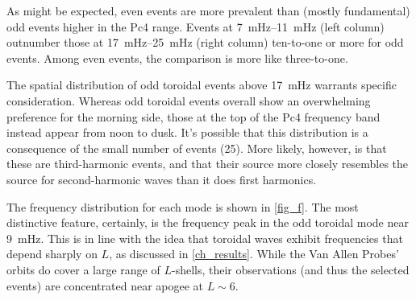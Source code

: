 
As might be expected, even events are more prevalent than (mostly fundamental)
odd events higher in the Pc4 range. Events at \SIrange{7}{11}{\mHz} (left
column) outnumber those at \SIrange{17}{25}{\mHz} (right column) ten-to-one or
more for odd events. Among even events, the comparison is more like
three-to-one. 

The spatial distribution of odd toroidal events above \SI{17}{\mHz} warrants
specific consideration. Whereas odd toroidal events overall show an
overwhelming preference for the morning side, those at the top of the Pc4
frequency band instead appear from noon to dusk. It's possible that this
distribution is a consequence of the small number of events (25). More likely,
however, is that these are third-harmonic events, and that their source more
closely resembles the source for second-harmonic waves than it does first
harmonics. 


The frequency distribution for each mode is shown in \cref{fig_f}. The most
distinctive feature, certainly, is the frequency peak in the odd toroidal mode
near \SI{9}{\mHz}. This is in line with the idea that toroidal waves exhibit
frequencies that depend sharply on $L$, as discussed in \cref{ch_results}.
While the Van Allen Probes' orbits do cover a large range of $L$-shells, their
observations (and thus the selected events) are concentrated near apogee at
$L \sim 6$. 

